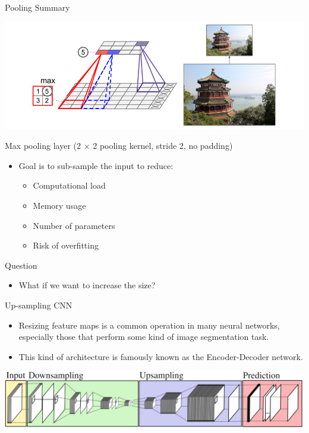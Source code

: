 \documentclass[default, aspectratio=169]{beamer}
\begin{document}
	
	\begin{frame}{Pooling Summary}
		\begin{minipage}{0.5\textwidth}
			\centering
			\includegraphics[keepaspectratio, scale=0.25]{pic/Pooling_2.png}
			
			\vspace{0.3cm}
			\small Max pooling layer (2 $\times$ 2 pooling kernel, stride 2, no padding)
		\end{minipage}%
		\hspace{0.4cm}  %
		\begin{minipage}{0.45\textwidth}
			\begin{itemize}
				\item Goal is to sub-sample the input to reduce:
				\begin{itemize}
					\item Computational load
					\item Memory usage
					\item Number of parameters
					\item Risk of overfitting
				\end{itemize}
			\end{itemize}
		\end{minipage}
	\end{frame}
	
	\begin{frame}{Question}
		\centering
		\begin{itemize}
			\item \Large What if we want to increase the size?
		\end{itemize}
	\end{frame}
	
	\begin{frame}{Up-sampling CNN}
		\vspace{0.5cm}
		\begin{itemize}
			\item Resizing feature maps is a common operation in many neural networks, especially those that perform some kind of image segmentation task.
			\item This kind of architecture is famously known as the Encoder-Decoder network.
		\end{itemize}
		
		\centering
		\includegraphics[keepaspectratio, scale=0.2]{pic/Upsamlpe_0.png}
				
	\end{frame}
	
\end{document}
